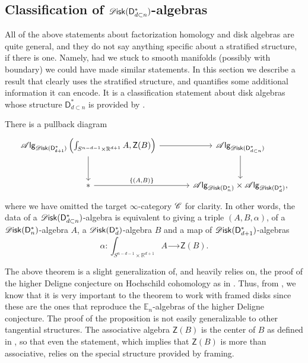 \documentclass[../text]{subfiles}
\begin{document}
\subsection{Classification of \texorpdfstring{$\disk(\mathsf{D}_{d \subset n}^{*})$}{diskdn*}-algebras}

All of the above statements about factorization homology and disk algebras are quite general, and they do not say anything specific about a stratified structure, if there is one. Namely, had we stuck to smooth manifolds (possibly with boundary) we could have made similar statements. In this section we describe a result that clearly uses the stratified structure, and quantifies some additional information it can encode. It is a classification statement about disk algebras whose structure $\mathsf{D}_{d \subset n}^*$ is provided by . %

\begin{theorem}\label{thm:classif_disk_d_under_n*_alg}
    There is a pullback diagram
    \begin{equation}
        \begin{tikzcd}[row sep=large, column sep = large]
            \alg{\disk(\mathsf{D_{d+1}^*})} \left(\int_{S^{n-d-1} \times \mathbb{R}^{d+1}} A, \mathsf{Z}(B) \right) \arrow[r] \arrow[d] & \alg{\disk(\mathsf{D}_{d \subset n}^*)} \arrow[d] \\
            * \arrow[r, "{\{(A, B)\}}"] & \alg{\disk(\mathsf{D}_{n}^*)} \times \alg{\disk(\mathsf{D}_d^*)},
        \end{tikzcd}
    \end{equation}
    where we have omitted the target $\infty$-category $\mathscr{C}$ for clarity. In other words, the data of a $\disk(\mathsf{D}_{d \subset n}^*)$-algebra is equivalent to giving a triple $(A, B, \alpha)$, of a $\disk(\mathsf{D}_n^*)$-algebra $A$, a $\disk(\mathsf{D}_d^*)$-algebra $B$ and a map of $\disk(\mathsf{D}_{d+1}^*)$-algebras
    \begin{equation}
        \alpha: \int_{S^{n-d-1} \times \mathbb{R}^{d+1}} A \xrightarrow{\ \ \quad} \mathsf{Z} (B).
    \end{equation}
\end{theorem}

\begin{remark}
    The above theorem is a slight generalization of, and heavily relies on, the proof of the higher Deligne conjecture on Hochschild cohomology as in \cite[sec.5.3]{lurie_ha}. Thus, from , we know that it is very important to the theorem to work with framed disks since these are the ones that reproduce the $\mathbb{E}_n$-algebras of the higher Deligne conjecture. The proof of the proposition is not easily generalizable to other tangential structures. The associative algebra $\mathsf{Z} (B)$ is the center of $B$ as defined in \cite[def.5.3.1.6]{lurie_ha}, so that even the statement, which implies that $\mathsf{Z}(B)$ is more than associative, relies on the special structure provided by framing.  
\end{remark}
\end{document}
